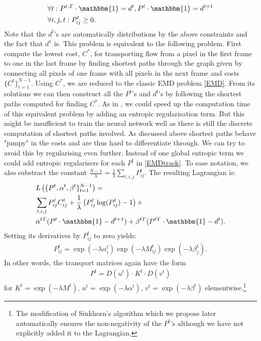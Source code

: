 \documentclass{article}
\begin{document}
{\begin{align}
&\forall t: P^{t,T} \cdot \mathbbm{1} = d^t, P^t\cdot \mathbbm{1} = d^{t+1} \nonumber\\
&\forall i,j,t: P^t_{ij} \geq 0.\nonumber
\end{align}
Note that the $d^t$'s are automatically distributions by the above constraints and the fact that $d^1$ is. This problem is equivalent to the following problem. First compute the lowest cost, $C^*$, for transporting flow from a pixel in the first frame to one in the last frame by finding shortest paths through the graph given by connecting all pixels of one frame with all pixels in the next frame and costs $\{C^t\}_{t=1}^{N-1}$. Using $C^*$, we are reduced to the classic EMD problem \eqref{EMD}. From its solutions we can then construct all the $P^t$'s and $d^t$'s by following the shortest paths computed for finding $C^*$. As in \cite{Cut13}, we could speed up the computation time of this equivalent problem by adding an entropic regularisation term. But this might be insufficient to train the neural network well as there is still the discrete computation of shortest paths involved. As discussed above shortest paths behave "jumpy" in the costs and are thus hard to differentiate through. We can try to avoid this by regularising even further. Instead of one global entropic term we could add entropic regularisers for each $P^t$ in \eqref{EMDtrack}. To ease notation, we also substract the  constant $\frac{N-1}{\lambda} = \frac{1}{\lambda} \sum_{t, i, j} P^t_{ij}$. The resulting Lagrangian is:
\begin{align*}
&L\left(\{P^t, \alpha^t, \beta^t\}_{t=1}^{N-1}\right)
= \\
&\sum_{t, i, j}  P^t_{ij} C^t_{ij} + \frac{1}{\lambda} \left( P^t_{ij}\log(P^t_{ij}) -1\right) +\\
 &\alpha^{t T} (P^t\cdot \mathbbm{1}- d^{t+1}) + \beta^{t T}(P^{tT} \cdot \mathbbm{1} - d^t).
\end{align*}
Setting its derivatives by $P^t_{ij}$ to zero yields:
\begin{align*}
P^t_{ij} = \exp\left(-\lambda\alpha_i^t\right) \exp\left(-\lambda M^t_{ij}\right) \exp\left(- \lambda\beta_j^t\right).
\end{align*}
In other words, the transport matrices again have the form
\begin{align*}
P^t = D(u^t)\cdot K^t \cdot D(v^t) 
\end{align*}
for $K^t = \exp\left(-\lambda M^t\right)$, $u^t =\exp\left(-\lambda\alpha^t\right)$,  \break $v^t=\exp\left(- \lambda\beta^t\right)$ elementwise.\footnote{The modification of Sinkhorn's algorithm which we propose later automatically ensures the non-negativity of the $P^t$'s although we have not explicitly added it to the Lagrangian.}
}
\end{document}

